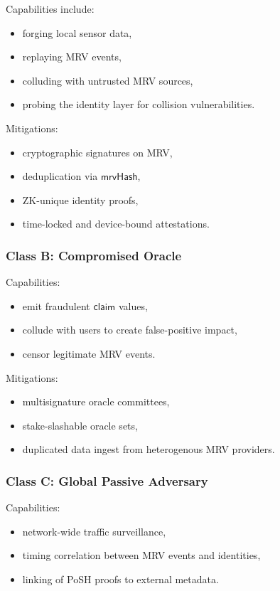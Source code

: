 \documentclass{article}
\begin{document}
Capabilities include:

\begin{itemize}
\item forging local sensor data,
\item replaying MRV events,
\item colluding with untrusted MRV sources,
\item probing the identity layer for collision vulnerabilities.
\end{itemize}

Mitigations:

\begin{itemize}
\item cryptographic signatures on MRV,
\item deduplication via $\mathsf{mrvHash}$,
\item ZK-unique identity proofs,
\item time-locked and device-bound attestations.
\end{itemize}

\subsubsection{Class B: Compromised Oracle}

Capabilities:

\begin{itemize}
\item emit fraudulent $\mathsf{claim}$ values,
\item collude with users to create false-positive impact,
\item censor legitimate MRV events.
\end{itemize}

Mitigations:

\begin{itemize}
\item multisignature oracle committees,
\item stake-slashable oracle sets,
\item duplicated data ingest from heterogenous MRV providers.
\end{itemize}

\subsubsection{Class C: Global Passive Adversary}

Capabilities:

\begin{itemize}
\item network-wide traffic surveillance,
\item timing correlation between MRV events and identities,
\item linking of PoSH proofs to external metadata.
\end{itemize}
\end{document}

